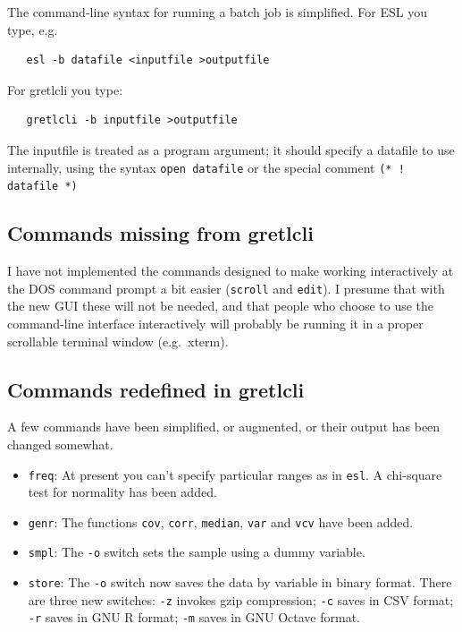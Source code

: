 \documentclass{article}
\begin{document}
The command-line syntax for running a batch job is simplified.  For ESL
you type, e.g.

\begin{verbatim}
   esl -b datafile <inputfile >outputfile
\end{verbatim}

\noindent For \textsf{gretlcli} you type:

\begin{verbatim}
   gretlcli -b inputfile >outputfile
\end{verbatim}

\noindent The inputfile is treated as a program argument; it should specify a
datafile to use internally, using the syntax
  \texttt{open datafile}  or the special comment \texttt{(* ! datafile *)}
  
\subsection{Commands missing from gretlcli}

I have not implemented the commands designed to make working
interactively at the DOS command prompt a bit easier (\texttt{scroll}
and \texttt{edit}).  I presume that with the new GUI these will not be
needed, and that people who choose to use the command-line interface
interactively will probably be running it in a proper scrollable
terminal window (e.g.\ xterm).

\subsection{Commands redefined in gretlcli}

A few commands have been simplified, or augmented, or their output has
been changed somewhat.

\begin{itemize}
\item \texttt{freq}: At present you can't specify particular ranges as
  in \texttt{esl}.  A chi-square test for normality has been added.
\item \texttt{genr}: The functions \texttt{cov}, \texttt{corr},
  \texttt{median}, \texttt{var} and \texttt{vcv} have been added.
\item \texttt{smpl}: The \texttt{-o} switch sets the sample using a
  dummy variable.
\item \texttt{store}: The \texttt{-o} switch now saves the data by
  variable in binary format.  There are three new switches:
  \texttt{-z} invokes gzip compression; \texttt{-c} saves in CSV
  format; \texttt{-r} saves in GNU R format; \texttt{-m} saves in GNU
  Octave format.
\end{itemize}
\end{document}
